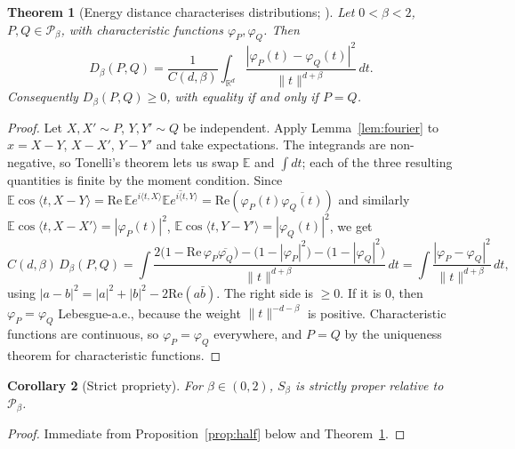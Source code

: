 \documentclass[11pt]{article}
\newtheorem{theorem}{Theorem}
\newtheorem{corollary}[theorem]{Corollary}
\theoremstyle{definition}
\theoremstyle{remark}
\newcommand{\R}{\mathbb{R}}
\newcommand{\E}{\mathbb{E}}
\newcommand{\Pb}{\mathcal{P}}
\newcommand{\norm}[1]{\lVert #1\rVert}
\newcommand{\ip}[2]{\langle #1, #2\rangle}
\newcommand{\Sb}{S_\beta}
\newcommand{\Db}{D_\beta}
\begin{document}
\begin{theorem}[Energy distance characterises distributions; {\cite[Props.~1--2]{SR2013}}]\label{thm:ed}
Let $0<\beta<2$, $P,Q\in\Pb_\beta$, with characteristic functions $\varphi_P,\varphi_Q$. Then
\begin{equation}\label{eq:edfourier}
\Db(P,Q)=\frac{1}{C(d,\beta)}\int_{\R^d}\frac{|\varphi_P(t)-\varphi_Q(t)|^2}{\norm{t}^{d+\beta}}\,dt .
\end{equation}
Consequently $\Db(P,Q)\ge0$, with equality if and only if $P=Q$.
\end{theorem}
\begin{proof}
Let $X,X'\sim P$, $Y,Y'\sim Q$ be independent. Apply Lemma~\ref{lem:fourier} to $x=X-Y$, $X-X'$, $Y-Y'$ and
take expectations. The integrands are non-negative, so Tonelli's theorem lets us swap $\E$ and $\int dt$; each
of the three resulting quantities is finite by the moment condition. Since
$\E\cos\ip{t}{X-Y}=\mathrm{Re}\,\E e^{i\ip{t}{X}}\overline{\E e^{i\ip{t}{Y}}}=\mathrm{Re}(\varphi_P(t)\overline{\varphi_Q(t)})$ and
similarly $\E\cos\ip{t}{X-X'}=|\varphi_P(t)|^2$, $\E\cos\ip{t}{Y-Y'}=|\varphi_Q(t)|^2$, we get
\[
C(d,\beta)\,\Db(P,Q)=\int\frac{2\big(1-\mathrm{Re}\,\varphi_P\overline{\varphi_Q}\big)-\big(1-|\varphi_P|^2\big)-\big(1-|\varphi_Q|^2\big)}{\norm{t}^{d+\beta}}\,dt
=\int\frac{|\varphi_P-\varphi_Q|^2}{\norm{t}^{d+\beta}}\,dt,
\]
using $|a-b|^2=|a|^2+|b|^2-2\mathrm{Re}(a\bar b)$. The right side is $\ge0$. If it is $0$, then
$\varphi_P=\varphi_Q$ Lebesgue-a.e., because the weight $\norm{t}^{-d-\beta}$ is positive. Characteristic
functions are continuous, so $\varphi_P=\varphi_Q$ everywhere, and $P=Q$ by the uniqueness theorem for
characteristic functions.
\end{proof}

\begin{corollary}[Strict propriety]\label{cor:strict}
For $\beta\in(0,2)$, $\Sb$ is strictly proper relative to $\Pb_\beta$.
\end{corollary}
\begin{proof}Immediate from Proposition~\ref{prop:half} below and Theorem~\ref{thm:ed}.\end{proof}
\end{document}
